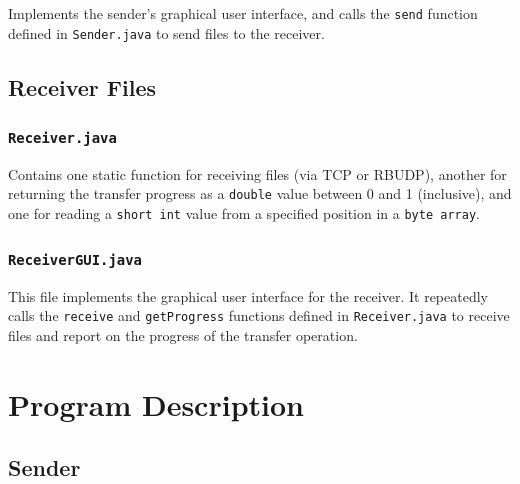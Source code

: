 \documentclass[10pt, a4paper]{article}
\begin{document}
Implements the sender's graphical user interface, and calls the \texttt{send}
function defined in \texttt{Sender.java} to send files to the receiver.

\subsection{Receiver Files}
\label{subsec:receiver-file-desc}

\subsubsection{\texttt{Receiver.java}}
\label{subsubsec:recv.java}

Contains one static function for receiving files (via TCP or RBUDP), another for
returning the transfer progress as a \texttt{double} value between 0 and 1
(inclusive), and one for reading a \texttt{short int} value from a specified
position in a \texttt{byte array}.

\subsubsection{\texttt{ReceiverGUI.java}}
\label{subsubsec:recv-gui.java}

This file implements the graphical user interface for the receiver. It
repeatedly calls the \texttt{receive} and \texttt{getProgress} functions defined
in \texttt{Receiver.java} to receive files and report on the progress of the
transfer operation.


\section{Program Description}
\label{sec:prog-desc}

\subsection{Sender}
\label{subsec:prog-desc-sender}
\end{document}
